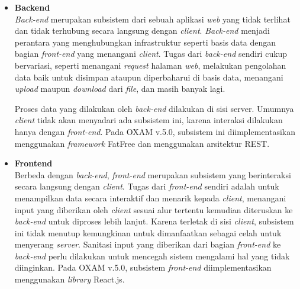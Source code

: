 \documentclass[a4paper,twoside]{article}
\begin{document}
\begin{enumerate}
\begin{itemize}
    		\begin{itemize}
    		    \item \textbf{Backend}\\
    		    \label{backend}
    		    \textit{Back-end} merupakan subsistem dari sebuah aplikasi \textit{web} yang tidak terlihat dan tidak terhubung secara langsung dengan \textit{client}. \textit{Back-end} menjadi perantara yang menghubungkan infrastruktur seperti basis data dengan bagian \textit{front-end} yang menangani \textit{client}. Tugas dari \textit{back-end} sendiri cukup bervariasi, seperti menangani \textit{request} halaman \textit{web}, melakukan pengolahan data baik untuk disimpan ataupun diperbaharui di basis data, menangani \textit{upload} maupun \textit{download} dari \textit{file}, dan masih banyak lagi. 
    		
        		Proses data yang dilakukan oleh \textit{back-end} dilakukan di sisi server. Umumnya \textit{client} tidak akan menyadari ada subsistem ini, karena interaksi dilakukan hanya dengan \textit{front-end}. Pada OXAM v.5.0, subsistem ini diimplementasikan menggunakan \textit{framework} FatFree dan menggunakan arsitektur REST.
    		    
    		    \item \textbf{Frontend}\\
    		    \label{frontend}
    		    Berbeda dengan \textit{back-end}, \textit{front-end} merupakan subsistem yang berinteraksi secara langsung dengan \textit{client}. Tugas dari \textit{front-end} sendiri adalah untuk menampilkan data secara interaktif dan menarik kepada \textit{client}, menangani input yang diberikan oleh \textit{client} sesuai alur tertentu kemudian diteruskan ke \textit{back-end} untuk diproses lebih lanjut. Karena terletak di sisi \textit{client}, subsistem ini tidak menutup kemungkinan untuk dimanfaatkan sebagai celah untuk menyerang \textit{server}. Sanitasi input yang diberikan dari bagian \textit{front-end} ke \textit{back-end} perlu dilakukan untuk mencegah sistem mengalami hal yang tidak diinginkan. Pada OXAM v.5.0, subsistem \textit{front-end} diimplementasikan menggunakan \textit{library} React.js.
    		    
    		\end{itemize}
		
		
		
		    

\end{itemize}
\end{enumerate}
\end{document}
